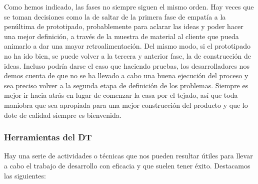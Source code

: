 Como hemos indicado, las fases no siempre siguen el mismo orden. Hay veces que se toman decisiones como la de saltar de la primera fase de empatía a la penúltima de prototipado, probablemente para aclarar las ideas y poder hacer una mejor definición, a través de la muestra de material al cliente que pueda animarlo a dar una mayor retroalimentación. Del mismo modo, si el prototipado no ha ido bien, se puede volver a la tercera y anterior fase, la de construcción de ideas. Incluso podría darse el caso que haciendo pruebas, los desarrolladores nos demos cuenta de que no se ha llevado a cabo una buena ejecución del proceso y sea preciso volver a la segunda etapa de definición de los problemas. Siempre es mejor ir hacia atrás en lugar de comenzar la casa por el tejado, así que toda maniobra que sea apropiada para una mejor construcción del producto y que lo dote de calidad siempre es bienvenida.


\subsubsection{Herramientas del DT}
\label{herramientasDT}

Hay una serie de actividades o técnicas que nos pueden resultar útiles para llevar a cabo el trabajo de desarrollo con eficacia y que suelen tener éxito. Destacamos las siguientes:

